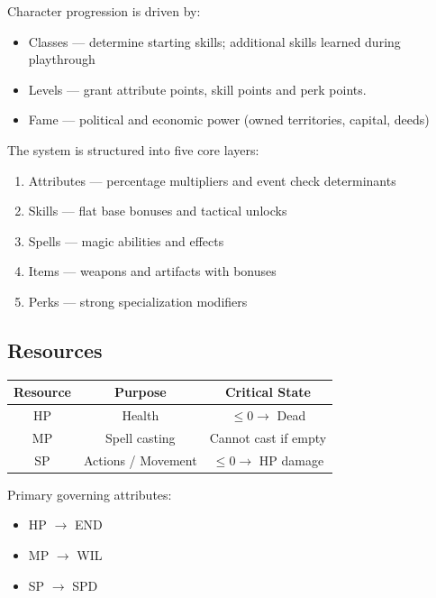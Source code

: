 \documentclass[a4paper,12pt]{article}
\begin{document}
Character progression is driven by:

\begin{itemize}
\item Classes — determine starting skills; additional skills learned during playthrough
\item Levels — grant attribute points, skill points and perk points.
\item Fame — political and economic power (owned territories, capital, deeds)
\end{itemize}

The system is structured into five core layers:

\begin{enumerate}
\item Attributes — percentage multipliers and event check determinants
\item Skills — flat base bonuses and tactical unlocks
\item Spells — magic abilities and effects
\item Items — weapons and artifacts with bonuses
\item Perks — strong specialization modifiers
\end{enumerate}

\subsection{Resources}

\begin{table}[H]
\centering
\begin{tabular}{|c|c|c|}
\hline
Resource & Purpose & Critical State \\
\hline
HP & Health & $\leq 0 \rightarrow$ Dead \\
MP & Spell casting & Cannot cast if empty \\
SP & Actions / Movement & $\leq 0 \rightarrow$ HP damage \\
\hline
\end{tabular}
\end{table}

Primary governing attributes:

\begin{itemize}
\item HP $\rightarrow$ END
\item MP $\rightarrow$ WIL
\item SP $\rightarrow$ SPD
\end{itemize}
\end{document}
